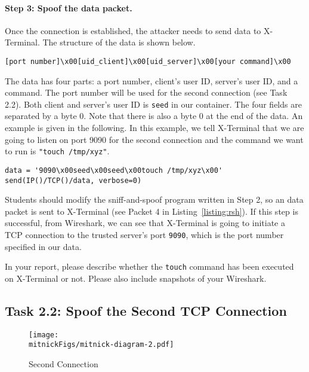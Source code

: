 \paragraph{Step 3: Spoof the \rsh data packet.}
Once the connection is established, the attacker needs to 
send \rsh data to X-Terminal.
The structure of the \rsh data is shown below.

\begin{lstlisting}
[port number]\x00[uid_client]\x00[uid_server]\x00[your command]\x00
\end{lstlisting}

The data has four parts: a port number, client's user ID, server's user ID,
and a command.
The port number will be used for the second connection (see Task 2.2). 
Both client and server's user ID is \texttt{seed} in our container. 
The four fields are separated by a byte 0.
Note that there is also a byte 0 at the end of the \rsh data. An example is given in the
following. In this example, we tell X-Terminal that we are going to listen on port 9090 for the
second connection and the command we want to run is \texttt{"touch /tmp/xyz"}. 

\begin{lstlisting}
data = '9090\x00seed\x00seed\x00touch /tmp/xyz\x00'
send(IP()/TCP()/data, verbose=0)
\end{lstlisting}
 

Students should modify the sniff-and-spoof program written in Step 2, so
an \rsh data packet is sent to X-Terminal (see Packet 4 
in Listing~\ref{listing:rsh}). 
If this step is successful, from Wireshark, we can see
that X-Terminal is going to initiate a TCP connection to the trusted server's port
\texttt{9090}, which is the port number specified in our \rsh data.  

In your report, please describe whether the \texttt{touch} command 
has been executed on X-Terminal or not. Please also 
include snapshots of your Wireshark. 


\subsection{Task 2.2: Spoof the Second TCP Connection}
\label{sec:second-conn}

\begin{figure}[htb]
\centering
\texttt{[image: \\mitnickFigs/mitnick-diagram-2.pdf]}
\caption{Second Connection}
\label{fig:second-conn}
\end{figure}


